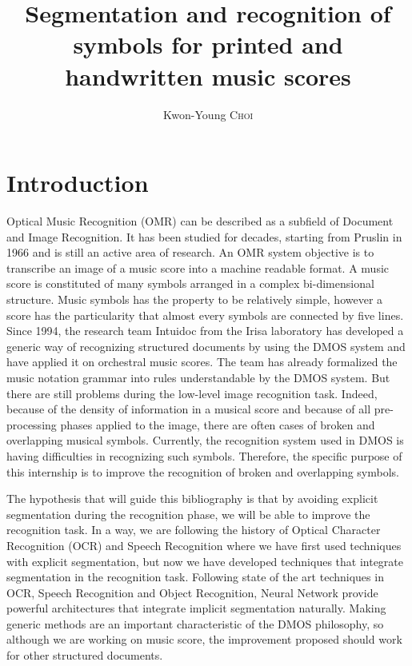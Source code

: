 \documentclass[11pt]{sdm}
\title{Segmentation and recognition of symbols for printed and handwritten music scores}
\author{Kwon-Young \textsc{Choi}}
\begin{document}
\maketitle


\section{Introduction}

Optical Music Recognition (OMR) can be described as a subfield of Document and Image Recognition.
It has been studied for decades, starting from Pruslin \cite{pruslin_automatic_1966} in 1966 and is still an active area of research.
An OMR system objective is to transcribe an image of a music score into a machine readable format.
A music score is constituted of many symbols arranged in a complex bi-dimensional structure.
Music symbols has the property to be relatively simple, however a score has the particularity that almost every symbols are connected by five lines.
Since 1994, the research team Intuidoc from the Irisa laboratory has developed a generic way of recognizing structured documents by using the DMOS system and have applied it on orchestral music scores.
The team has already formalized the music notation grammar into rules understandable by the DMOS system.
But there are still problems during the low-level image recognition task.
Indeed, because of the density of information in a musical score and because of all pre-processing phases applied to the image, there are often cases of broken and overlapping musical symbols.
Currently, the recognition system used in DMOS is having difficulties in recognizing such symbols.
Therefore, the specific purpose of this internship is to improve the recognition of broken and overlapping symbols.

The hypothesis that will guide this bibliography is that by avoiding explicit segmentation during the recognition phase, we will be able to improve the recognition task.
In a way, we are following the history of Optical Character Recognition (OCR) and Speech Recognition where we have first used techniques with explicit segmentation, but now we have developed techniques that integrate segmentation in the recognition task.
Following state of the art techniques in OCR, Speech Recognition and Object Recognition, Neural Network provide powerful architectures that integrate implicit segmentation naturally.
Making generic methods are an important characteristic of the DMOS philosophy, so although we are working on music score, the improvement proposed should work for other structured documents.
\end{document}
